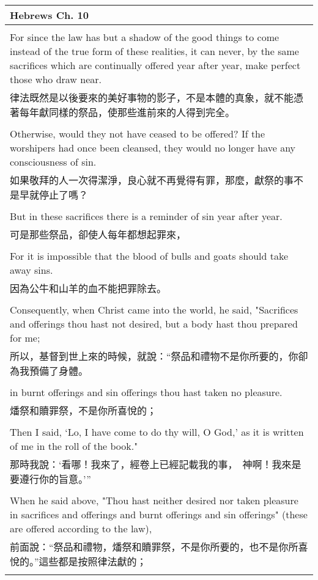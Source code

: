 \begin{tabularx}{\textwidth}{p{}}
\hline
Hebrews Ch. 10 \\
\hline \\
For since the law has but a shadow of the good things to come instead of the true form of these realities, it can never, by the same sacrifices which are continually offered year after year, make perfect those who draw near. \\
律法既然是以後要來的美好事物的影子，不是本體的真象，就不能憑著每年獻同樣的祭品，使那些進前來的人得到完全。 \\ \\
Otherwise, would they not have ceased to be offered? If the worshipers had once been cleansed, they would no longer have any consciousness of sin. \\
如果敬拜的人一次得潔淨，良心就不再覺得有罪，那麼，獻祭的事不是早就停止了嗎？ \\ \\
But in these sacrifices there is a reminder of sin year after year. \\
可是那些祭品，卻使人每年都想起罪來， \\ \\
For it is impossible that the blood of bulls and goats should take away sins. \\
因為公牛和山羊的血不能把罪除去。 \\ \\
Consequently, when Christ came into the world, he said,  "Sacrifices and offerings thou hast not desired, but a body hast thou prepared for me; \\
所以，基督到世上來的時候，就說：“祭品和禮物不是你所要的，你卻為我預備了身體。 \\ \\
in burnt offerings and sin offerings thou hast taken no pleasure. \\
燔祭和贖罪祭，不是你所喜悅的； \\ \\
Then I said, `Lo, I have come to do thy will, O God,' as it is written of me in the roll of the book." \\
那時我說：‘看哪！我來了，經卷上已經記載我的事，　神啊！我來是要遵行你的旨意。’” \\ \\
When he said above, "Thou hast neither desired nor taken pleasure in sacrifices and offerings and burnt offerings and sin offerings" (these are offered according to the law), \\
前面說：“祭品和禮物，燔祭和贖罪祭，不是你所要的，也不是你所喜悅的。”這些都是按照律法獻的； \\ \\

\end{tabularx}
